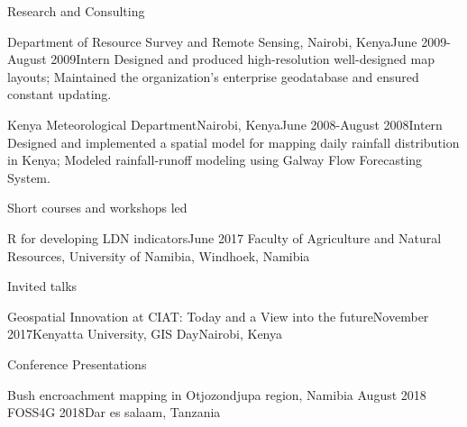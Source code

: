 \documentclass{resume} %
\begin{document}
\begin{rSection}{Research and Consulting}
\begin{pSubsection}{Department of Resource Survey and Remote Sensing, }{Nairobi, Kenya}{June 2009-August 2009}{Intern}
{Designed and produced high-resolution well-designed map layouts; Maintained the organization's enterprise geodatabase and ensured constant updating.}
\end{pSubsection}


\begin{pSubsection}{Kenya Meteorological Department}{Nairobi, Kenya}{June 2008-August 2008}{Intern}
{Designed and implemented a spatial model for mapping daily rainfall distribution in Kenya; Modeled rainfall-runoff modeling using Galway Flow Forecasting System.}
\end{pSubsection}
\end{rSection}



\begin{rSection}{Short courses and workshops led}

\begin{sSubsection}{R for developing LDN indicators}{}{June 2017}{ Faculty of Agriculture and Natural Resources, University of Namibia, }{Windhoek, Namibia}
\end{sSubsection}
\end{rSection}


\begin{rSection}{Invited talks}

\begin{sSubsection}{Geospatial Innovation at CIAT: Today and a View into the future}{}{November 2017}{Kenyatta University, GIS Day}{Nairobi, Kenya}
\end{sSubsection}
\end{rSection}

\begin{rSection}{Conference Presentations}

\begin{sSubsection}{Bush encroachment mapping in Otjozondjupa region, Namibia}{ }{August 2018}{ FOSS4G 2018}{Dar es salaam, Tanzania}
\end{sSubsection}
\end{rSection}
\end{document}
